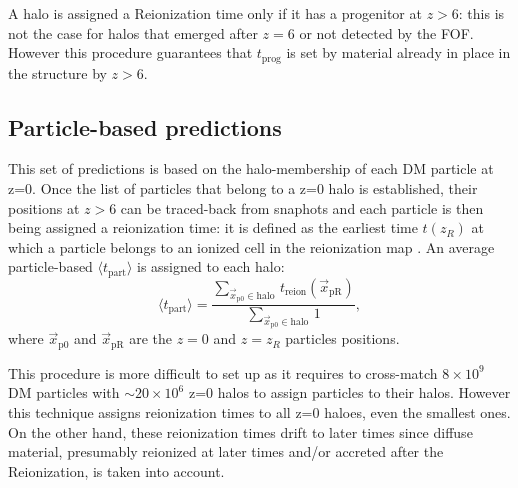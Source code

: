 \documentclass[twocolumn]{aastex61}
\begin{document}
A halo is assigned a Reionization time only if it has a progenitor at $z>6$: this is not the case for halos that emerged after $z=6$ or not detected by the FOF. %
However this procedure guarantees that $t_\mathrm{prog}$ is set by material already in place in the structure by $z>6$. 


\subsection{Particle-based predictions}
This set of predictions is based on the halo-membership of each DM particle at z=0. %
 Once the list of particles that belong to a z=0 halo is established, their positions at $z>6$ can be traced-back from snaphots and each particle is then being assigned a reionization time: it is defined as the earliest time $t(z_R)$ at which a particle belongs to an ionized cell in the reionization map . An average particle-based $\langle t_\mathrm{part} \rangle$  is assigned to each halo:
\begin{equation}
\langle t_\mathrm{part}\rangle=\frac{\sum_{\vec x_\mathrm{p0} \in \mathrm{halo} \ } t_\mathrm{reion}(\vec x_\mathrm{pR})}{\sum_{\vec x_\mathrm{p0} \in \mathrm{halo} \ } 1},
\end{equation}
where $\vec x_\mathrm{p0}$ and $\vec x_\mathrm{pR}$ are the $z=0$ and $z=z_R$ particles positions.

This procedure is more difficult to set up as it requires to cross-match $8\times 10^9$ DM particles with $\sim 20\times 10^6$ z=0 halos  to assign particles to their halos. 
However this technique assigns reionization times to all z=0 haloes, even the smallest ones. On the other hand, these reionization times drift to later times since diffuse material, presumably reionized at later times and/or  accreted after the Reionization, is taken into account. 
 
\end{document}
